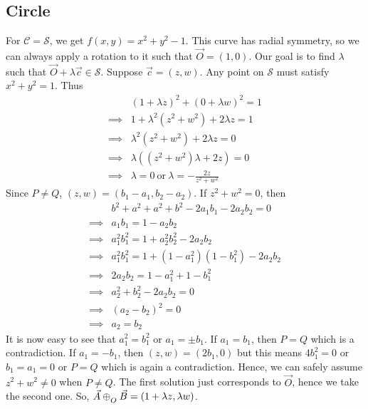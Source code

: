 \subsection*{Circle}

For $\mathcal{C}=\mathcal{S}$, we get $f(x,y) = x^2 + y^2 - 1$. This curve has
radial symmetry, so we can always apply a rotation to it such that
$\vec{O}=(1,0)$. Our goal is to find $\lambda$ such that
$\vec{O}+\lambda\vec{c}\in\mathcal{S}$. Suppose $\vec{c}=(z,w)$. Any point on
$\mathcal{S}$ must satisfy $x^2+y^2=1$. Thus
\begin{align*}
    &(1 + \lambda z)^2 + (0 + \lambda w)^2 = 1 \\
    \implies& 1 + \lambda^2 (z^2 + w^2) + 2 \lambda z = 1 \\
    \implies& \lambda^2 (z^2 + w^2) + 2 \lambda z = 0 \\
    \implies& \lambda((z^2 + w^2)\lambda + 2 z) = 0 \\
    \implies& \lambda = 0\ \mathrm{or}\ \lambda = -\frac{2 z}{z^2 + w^2}
\end{align*}
Since $P \neq Q$, $(z,w)=(b_1-a_1,b_2-a_2)$. If $z^2+w^2=0$, then
\begin{align*}
    & b^2+a^2+a^2+b^2-2 a_1 b_1-2 a_2 b_2 = 0 \\
    \implies& a_1 b_1 = 1 - a_2 b_2 \\
    \implies& a_1^2 b_1^2 = 1 + a_2^2 b_2^2 - 2 a_2 b_2 \\
    \implies& a_1^2 b_1^2 = 1 + (1-a_1^2)(1-b_1^2) - 2 a_2 b_2 \\
    \implies& 2 a_2 b_2 = 1 - a_1^2 + 1 - b_1^2 \\
    \implies& a_2^2 + b_2^2 - 2 a_2 b_2 = 0 \\
    \implies& (a_2 - b_2)^2 = 0 \\
    \implies& a_2 = b_2
\end{align*}
It is now easy to see that $a_1^2=b_1^2$ or $a_1=\pm b_1$. If $a_1=b_1$, then
$P=Q$ which is a contradiction. If $a_1=-b_1$, then $(z,w)=(2b_1,0)$ but this
means $4b_1^2=0$ or $b_1=a_1=0$ or $P=Q$ which is again a contradiction. Hence,
we can safely assume $z^2+w^2 \neq 0$ when $P \neq Q$. The first solution just
corresponds to $\vec{O}$, hence we take the second one. So,
$\vec{A}\conop\vec{B}=(1+\lambda z,\lambda w)$.

